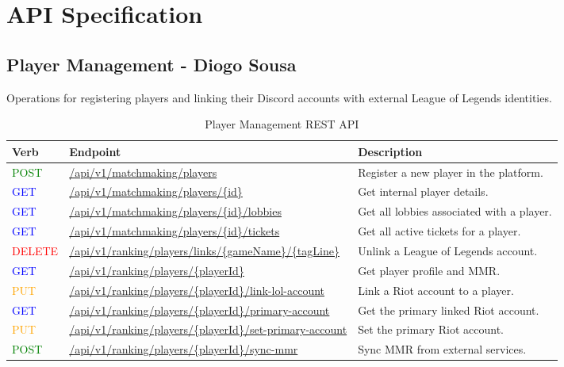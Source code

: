 \documentclass[11pt,a4paper]{article}
\newcommand{\postapi}{\textcolor{green}{POST}}
\newcommand{\getapi}{\textcolor{blue}{GET}}
\newcommand{\putapi}{\textcolor{orange}{PUT}}
\newcommand{\deleteapi}{\textcolor{red}{DELETE}}
\newcommand{\matchmaking}[1]{/api/v1/matchmaking#1}
\newcommand{\ranking}[1]{/api/v1/ranking#1}
\newcommand{\bff}[1]{\textbf{#1}}
\begin{document}
 \section{API Specification}


 \subsection{Player Management - Diogo Sousa}

 Operations for registering players and linking their Discord accounts with external League of Legends identities.

 \begin{table}[H]
 \begin{tabular}{|p{2cm}|p{5cm}|p{7cm}|}
 \hline
 \bff{Verb} & \bff{Endpoint}            & \bff{Description} \\ \hline
 \postapi & \url{\matchmaking{/players}}       & Register a new player in the platform. \\ \hline
 \getapi & \url{\matchmaking{/players/{id}}}      & Get internal player details. \\ \hline
 \getapi & \url{\matchmaking{/players/{id}/lobbies}}    & Get all lobbies associated with a player. \\ \hline
 \getapi & \url{\matchmaking{/players/{id}/tickets}}    & Get all active tickets for a player. \\ \hline
 \deleteapi & \url{\ranking{/players/links/{gameName}/{tagLine}}}  & Unlink a League of Legends account. \\ \hline
 \getapi & \url{\ranking{/players/{playerId}}}      & Get player profile and MMR. \\ \hline
 \putapi & \url{\ranking{/players/{playerId}/link-lol-account}} & Link a Riot account to a player. \\ \hline
 \getapi & \url{\ranking{/players/{playerId}/primary-account}}  & Get the primary linked Riot account. \\ \hline
 \putapi & \url{\ranking{/players/{playerId}/set-primary-account}} & Set the primary Riot account. \\ \hline
 \postapi & \url{\ranking{/players/{playerId}/sync-mmr}}   & Sync MMR from external services. \\ \hline
 \end{tabular}
 \caption{Player Management REST API}
 \label{tab:api-player-management}
 \end{table}
\end{document}
